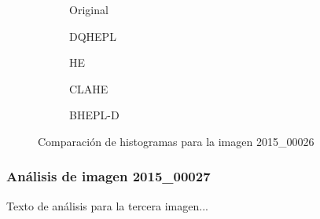 \documentclass[sigchi]{acmart}
\begin{document}
\begin{figure}[H]
	\centering
	\begin{subfigure}[b]{0.45\textwidth}
		\resizebox{\linewidth}{!}{}
		\caption{Original}
		\label{fig:original_2}
	\end{subfigure}
	\hfill
	\begin{subfigure}[b]{0.45\textwidth}
		\resizebox{\linewidth}{!}{}
		\caption{DQHEPL}
		\label{fig:dqhepl_2}
	\end{subfigure}

	\vspace{5mm}

	\begin{subfigure}[b]{0.45\textwidth}
		\resizebox{\linewidth}{!}{}
		\caption{HE}
		\label{fig:he_2}
	\end{subfigure}
	\hfill
	\begin{subfigure}[b]{0.45\textwidth}
		\resizebox{\linewidth}{!}{}
		\caption{CLAHE}
		\label{fig:clahe_2}
	\end{subfigure}

	\vspace{5mm}

	\centering
	\begin{subfigure}[b]{0.45\textwidth}
		\resizebox{\linewidth}{!}{}
		\caption{BHEPL-D}
		\label{fig:bhepl_2}
	\end{subfigure}

	\caption{Comparación de histogramas para la imagen 2015\_00026}
	\label{fig:histogramas_2}
\end{figure}

\subsubsection{Análisis de imagen 2015\_00027}

Texto de análisis para la tercera imagen...
\end{document}
